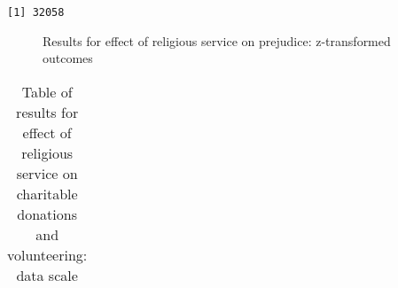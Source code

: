 \documentclass[
  singlecolumn]{article}
\begin{document}
\begin{verbatim}
[1] 32058
\end{verbatim}

\begin{figure}


\caption{\label{fig-results-church-on-prejudice}Results for effect of
religious service on prejudice: z-transformed outcomes}

\end{figure}%

\newpage{}

\begin{longtable}[]{@{}
  >{\raggedright\arraybackslash}p{}
  >{\raggedleft\arraybackslash}p{}
  >{\raggedleft\arraybackslash}p{}
  >{\raggedleft\arraybackslash}p{}
  >{\raggedleft\arraybackslash}p{}
  >{\raggedleft\arraybackslash}p{}@{}}

\caption{\label{tbl-results-church-on-prejudice}Table of results for
effect of religious service on charitable donations and volunteering:
data scale}

\tabularnewline


\end{longtable}
\end{document}
